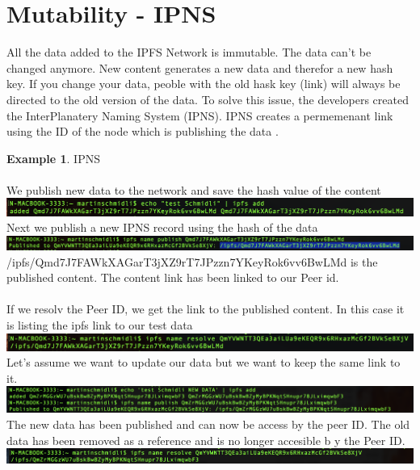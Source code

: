 \documentclass[a4paper,11pt, oneside]{report}
\theoremstyle{definition}
\newtheorem{exmp}{Example}[subsection]
\begin{document}
\section{Mutability - IPNS}
All the data added to the IPFS Network is immutable. The data can't be changed anymore. New content generates a new data and therefor a new hash key. If you change your data, peoble with the old hask key (link) will always be directed to the old version of the data. To solve this issue, the developers created the InterPlanatery Naming System (IPNS). IPNS creates a permemenant link using the ID of the node which is publishing the data .
\begin{exmp} IPNS\\ \\
We publish new data to the network and save the hash value of the content\\[0.3cm]
\includegraphics[width=\textwidth]{img/ipns1.png}\\[0.3cm]
Next we publish a new IPNS record using the hash of the data\\[0.3cm]
\includegraphics[width=\textwidth]{img/ipns2.png}\\[0.3cm]
/ipfs/Qmd7J7FAWkXAGarT3jXZ9rT7JPzzn7YKeyRok6vv6BwLMd is the published content. The content link has been linked to our Peer id.\\ \\
If we resolv the Peer ID, we get the link to the published content. In this case it is listing the ipfs link to our test data\\[0.3cm]
\includegraphics[width=\textwidth]{img/ipns3.png}\\[0.3cm]
Let's assume we want to update our data but we want to keep the same link to it.
\includegraphics[width=\textwidth]{img/ipns4.png}\\[0.3cm]
The new data has been published and can now be access by the peer ID. The old data has been removed as a reference and is no longer accesible b y the Peer ID.\\[0.3cm]
\includegraphics[width=\textwidth]{img/ipns5.png}
\end{exmp}
\end{document}
